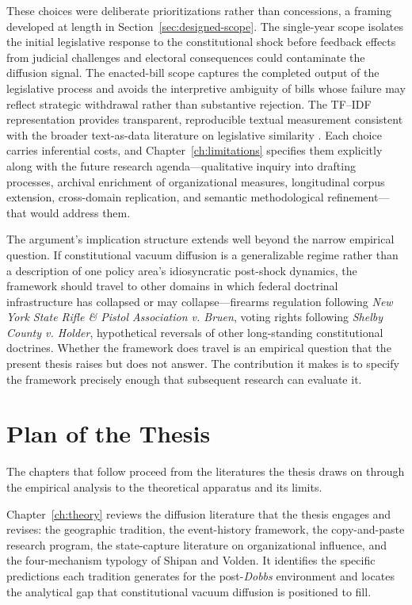 These choices were deliberate prioritizations rather than concessions, a framing developed at length in Section~\ref{sec:designed-scope}. The single-year scope isolates the initial legislative response to the constitutional shock before feedback effects from judicial challenges and electoral consequences could contaminate the diffusion signal. The enacted-bill scope captures the completed output of the legislative process and avoids the interpretive ambiguity of bills whose failure may reflect strategic withdrawal rather than substantive rejection. The TF--IDF representation provides transparent, reproducible textual measurement consistent with the broader text-as-data literature on legislative similarity \parencite{wilkersonTracingFlowPolicy2015,linderTextPolicyMeasuring2020}. Each choice carries inferential costs, and Chapter~\ref{ch:limitations} specifies them explicitly along with the future research agenda---qualitative inquiry into drafting processes, archival enrichment of organizational measures, longitudinal corpus extension, cross-domain replication, and semantic methodological refinement---that would address them.

The argument's implication structure extends well beyond the narrow empirical question. If constitutional vacuum diffusion is a generalizable regime rather than a description of one policy area's idiosyncratic post-shock dynamics, the framework should travel to other domains in which federal doctrinal infrastructure has collapsed or may collapse---firearms regulation following \textit{New York State Rifle \& Pistol Association v. Bruen}, voting rights following \textit{Shelby County v. Holder}, hypothetical reversals of other long-standing constitutional doctrines. Whether the framework does travel is an empirical question that the present thesis raises but does not answer. The contribution it makes is to specify the framework precisely enough that subsequent research can evaluate it.

\section{Plan of the Thesis}

The chapters that follow proceed from the literatures the thesis draws on through the empirical analysis to the theoretical apparatus and its limits.

Chapter~\ref{ch:theory} reviews the diffusion literature that the thesis engages and revises: the geographic tradition, the event-history framework, the copy-and-paste research program, the state-capture literature on organizational influence, and the four-mechanism typology of Shipan and Volden. It identifies the specific predictions each tradition generates for the post-\textit{Dobbs} environment and locates the analytical gap that constitutional vacuum diffusion is positioned to fill.

